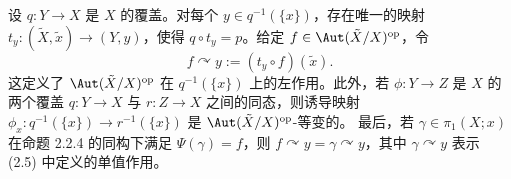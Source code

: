 \begin{proposition}\label{prop:2.2.5}
设 $q:Y\to X$ 是 $X$ 的覆盖。对每个 $y\in q^{-1}(\{x\})$，存在唯一的映射
$t_y:(\tilde X,\tilde x)\to(Y,y)$，使得 $q\circ t_y=p$。给定
$f\in\Aut(\tilde X/X)^{\mathrm{op}}$，令
\begin{equation}\label{eq:2.10}
f\curvearrowright y:=(t_y\circ f)(\tilde x).
\end{equation}
这定义了 $\Aut(\tilde X/X)^{\mathrm{op}}$ 在 $q^{-1}(\{x\})$ 上的左作用。此外，若
$\phi:Y\to Z$ 是 $X$ 的两个覆盖 $q:Y\to X$ 与 $r:Z\to X$ 之间的同态，则诱导映射
$\phi_x:q^{-1}(\{x\})\to r^{-1}(\{x\})$ 是 $\Aut(\tilde X/X)^{\mathrm{op}}$-等变的。
最后，若 $\gamma\in\pi_1(X;x)$ 在命题 2.2.4 的同构下满足 $\Psi(\gamma)=f$，则
$f\curvearrowright y=\gamma\curvearrowright y$，其中 $\gamma\curvearrowright y$ 表示
(2.5) 中定义的单值作用。
\end{proposition}

